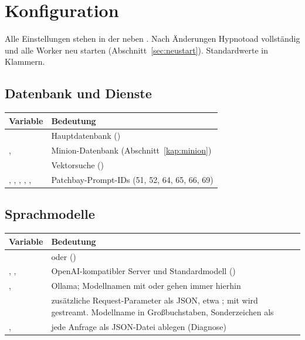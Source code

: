 \documentclass[11pt,a4paper,parskip=half-,headings=standardclasses,toc=bibliography,open=any]{scrreprt}
\begin{document}
\chapter{Konfiguration}\label{kap:konfig}

Alle Einstellungen stehen in der  neben . Nach Änderungen Hypnotoad vollständig und alle Worker neu starten (Abschnitt~\ref{sec:neustart}). Standardwerte in Klammern.

\section{Datenbank und Dienste}

\begin{longtable}{@{}P{6.4cm}p{8.2cm}@{}}
\toprule
\textbf{Variable} & \textbf{Bedeutung}\\
\midrule
\endhead
{} & Hauptdatenbank ()\\
,  & Minion-Datenbank (Abschnitt~\ref{kap:minion})\\
 & Vektorsuche ()\\
, , , , ,  & Patchbay-Prompt-IDs (51, 52, 64, 65, 66, 69)\\
\bottomrule
\end{longtable}

\section{Sprachmodelle}

\begin{longtable}{@{}P{6.4cm}p{8.2cm}@{}}
\toprule
\textbf{Variable} & \textbf{Bedeutung}\\
\midrule
\endhead
{} &  oder  ()\\
, ,  & OpenAI-kompatibler Server und Standardmodell ()\\
,  & Ollama; Modellnamen mit  oder  gehen immer hierhin\\
 & zusätzliche Request-Parameter als JSON, etwa ; mit  wird gestreamt. Modellname in Großbuchstaben, Sonderzeichen als \code{_}\\
,  & jede Anfrage als JSON-Datei ablegen (Diagnose)\\
\bottomrule
\end{longtable}
\end{document}
